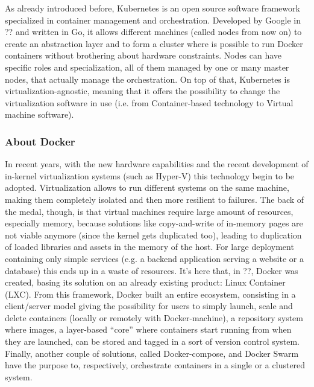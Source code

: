 \documentclass[10pt]{book}
\begin{document}
As already introduced before, Kubernetes is an open source software framework
specialized in container management and orchestration. Developed by Google in
?? and written in Go, it allows different
machines (called nodes from now on) to create an abstraction layer and to form
a cluster where is possible to run Docker containers without brothering about
hardware constraints. Nodes can have specific roles and specialization, all of
them managed by one or many master nodes, that actually manage the
orchestration.
On top of that, Kubernetes is virtualization-agnostic, meaning that it offers
the possibility to change the virtualization software in use (i.e. from
Container-based technology to Virtual machine software).

\subsubsection{About Docker}

In recent years, with the new hardware capabilities and the recent development
of in-kernel virtualization systems (such as Hyper-V) this technology
begin to be adopted. Virtualization allows to run different systems on the
same machine, making them completely isolated and then more resilient to
failures. The back of the medal, though, is that virtual machines require large
amount of resources, especially memory, because solutions like copy-and-write
of in-memory pages are not viable anymore (since the kernel gets duplicated
too), leading to duplication of loaded libraries and assets in the memory of
the host.
For large deployment containing only simple services (e.g. a backend
application serving a website or a database) this ends up in a waste of
resources.  It's here that, in ??, Docker was
created, basing its solution on an already existing product: Linux Container
(LXC). From this framework, Docker built an entire ecosystem, consisting in a
client/server model giving the possibility for users to simply launch, scale and
delete containers (locally or remotely with Docker-machine), a repository
system where images, a layer-based ``core'' where containers start running from
when they are launched, can be stored and tagged in a sort of version control
system. Finally, another couple of solutions, called Docker-compose, and Docker
Swarm have the purpose to, respectively, orchestrate containers in a single or
a clustered system. 
\end{document}
